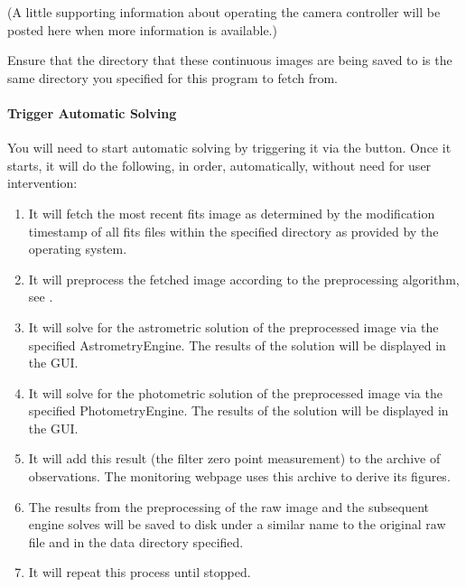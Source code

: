 \documentclass[letterpaper,11pt,english]{sphinxmanual}
\begin{document}
\sphinxAtStartPar
(A little supporting information about operating the camera controller will
be posted here when more information is available.)

\sphinxAtStartPar
Ensure that the directory that these continuous images are being saved to is
the same directory you specified for this program to fetch from.


\paragraph{Trigger Automatic Solving}
\label{\detokenize{user/automatic_mode:trigger-automatic-solving}}
\sphinxAtStartPar
You will need to start automatic solving by triggering it via the
 button. Once it starts, it will do the following, in order,
automatically, without need for user intervention:
\begin{enumerate}
%
\item {} 
\sphinxAtStartPar
It will fetch the most recent fits image as determined by the modification timestamp of all fits files within the specified directory as provided by the operating system.

\item {} 
\sphinxAtStartPar
It will pre\sphinxhyphen{}process the fetched image according to the preprocessing algorithm, see {\hyperref[\detokenize{technical/algorithms/preprocessing:technical-algorithms-preprocessing}]{}}.

\item {} 
\sphinxAtStartPar
It will solve for the astrometric solution of the pre\sphinxhyphen{}processed image via the specified AstrometryEngine. The results of the solution will be displayed in the GUI.

\item {} 
\sphinxAtStartPar
It will solve for the photometric solution of the pre\sphinxhyphen{}processed image via the specified PhotometryEngine. The results of the solution will be displayed in the GUI.

\item {} 
\sphinxAtStartPar
It will add this result (the filter zero point measurement) to the archive of observations. The monitoring webpage uses this archive to derive its figures.

\item {} 
\sphinxAtStartPar
The results from the pre\sphinxhyphen{}processing of the raw image and the subsequent engine solves will be saved to disk under a similar name to the original raw file and in the data directory specified.

\item {} 
\sphinxAtStartPar
It will repeat this process until stopped.

\end{enumerate}
\end{document}
